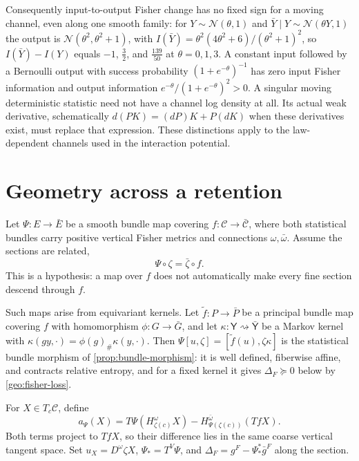 Consequently input-to-output Fisher change has no fixed sign for a moving channel, even along one smooth family: for $Y\sim\mathcal N(\theta,1)$ and $\bar Y\mid Y\sim\mathcal N(\theta Y,1)$ the output is $\mathcal N(\theta^2,\theta^2+1)$, with $I(\bar Y)=\theta^2(4\theta^2+6)/(\theta^2+1)^2$, so $I(\bar Y)-I(Y)$ equals $-1$, $\tfrac32$, and $\tfrac{139}{50}$ at $\theta=0,1,3$. A constant input followed by a Bernoulli output with success probability $(1+e^{-\theta})^{-1}$ has zero input Fisher information and output information $e^{-\theta}/(1+e^{-\theta})^2>0$. A singular moving deterministic statistic need not have a channel log density at all. Its actual weak derivative, schematically $d(PK)=(dP)K+P(dK)$ when these derivatives exist, must replace that expression. These distinctions apply to the law-dependent channels used in the interaction potential.

\section{Geometry across a retention}

Let $\Psi:E\to\bar E$ be a smooth bundle map covering $f:\mathcal C\to\bar{\mathcal C}$, where both statistical bundles carry positive vertical Fisher metrics and connections $\omega,\bar\omega$. Assume the sections are related,
\begin{equation}
\Psi\circ\zeta=\bar\zeta\circ f.
\label{geo:related-sections}
\end{equation}
This is a hypothesis: a map over $f$ does not automatically make every fine section descend through $f$.

Such maps arise from equivariant kernels. Let $\tilde f:P\to\bar P$ be a principal bundle map covering $f$ with homomorphism $\phi:G\to\bar G$, and let $\kappa:\mathsf Y\rightsquigarrow\bar{\mathsf Y}$ be a Markov kernel with $\kappa(gy,\cdot)=\phi(g)_\#\kappa(y,\cdot)$. Then $\Psi[u,\zeta]=[\tilde f(u),\zeta\kappa]$ is the statistical bundle morphism of \cref{prop:bundle-morphism}: it is well defined, fiberwise affine, and contracts relative entropy, and for a fixed kernel it gives $\Delta_F\succeq0$ below by \cref{geo:fisher-loss}.

For $X\in T_c\mathcal C$, define
\begin{equation}
a_\Psi(X)=T\Psi(H^\omega_{\zeta(c)}X)
-H^{\bar\omega}_{\Psi(\zeta(c))}(TfX).
\label{geo:horizontal-defect-formula}
\end{equation}
Both terms project to $TfX$, so their difference lies in the same coarse vertical tangent space. Set
$u_X=D^\omega\zeta X$, $\Psi_*=T^V\Psi$, and
$\Delta_F=g^F-\Psi_*^*\bar g^F$ along the section.

